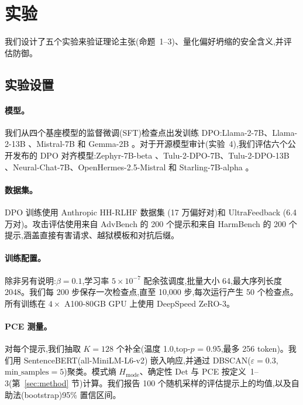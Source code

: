 
\section{实验}
\label{sec:experiments}

我们设计了五个实验来验证理论主张(命题~1--3)、量化偏好坍缩的安全含义,并评估防御。

\subsection{实验设置}
\label{sec:setup}

\paragraph{模型。} 我们从四个基座模型的监督微调(SFT)检查点出发训练 DPO:Llama-2-7B、Llama-2-13B \citep{touvron2023llama}、Mistral-7B \citep{jiang2023mistral} 和 Gemma-2B \citep{team2024gemma}。对于开源模型审计(实验~4),我们评估六个公开发布的 DPO 对齐模型:Zephyr-7B-beta \citep{tunstall2023zephyr}、Tulu-2-DPO-7B、Tulu-2-DPO-13B \citep{ivison2023camels}、Neural-Chat-7B、OpenHermes-2.5-Mistral \citep{teknium2023openhermes} 和 Starling-7B-alpha \citep{zhu2023starling}。

\paragraph{数据集。} DPO 训练使用 Anthropic HH-RLHF 数据集 \citep{bai2022training}(17 万偏好对)和 UltraFeedback \citep{cui2023ultrafeedback}(6.4 万对)。攻击评估使用来自 AdvBench \citep{zou2023universal} 的 200 个提示和来自 HarmBench \citep{mazeika2024harmbench} 的 200 个提示,涵盖直接有害请求、越狱模板和对抗后缀。

\paragraph{训练配置。} 除非另有说明:$\beta = 0.1$,学习率 $5 \times 10^{-7}$ 配余弦调度,批量大小 64,最大序列长度 2048。我们每 200 步保存一次检查点,直至 10{,}000 步,每次运行产生 50 个检查点。所有训练在 $4 \times$ A100-80GB GPU 上使用 DeepSpeed ZeRO-3。

\paragraph{PCE 测量。} 对每个提示,我们抽取 $K = 128$ 个补全(温度 1.0,top-$p$ = 0.95,最多 256 token)。我们用 SentenceBERT(all-MiniLM-L6-v2)\citep{reimers2019sentence} 嵌入响应,并通过 DBSCAN($\varepsilon = 0.3$,$\text{min\_samples} = 5$)聚类。模式熵 $H_{\text{mode}}$、确定性 $\text{Det}$ 与 PCE 按定义~1--3(第~\ref{sec:method} 节)计算。我们报告 100 个随机采样的评估提示上的均值,以及自助法(bootstrap)95\% 置信区间。

